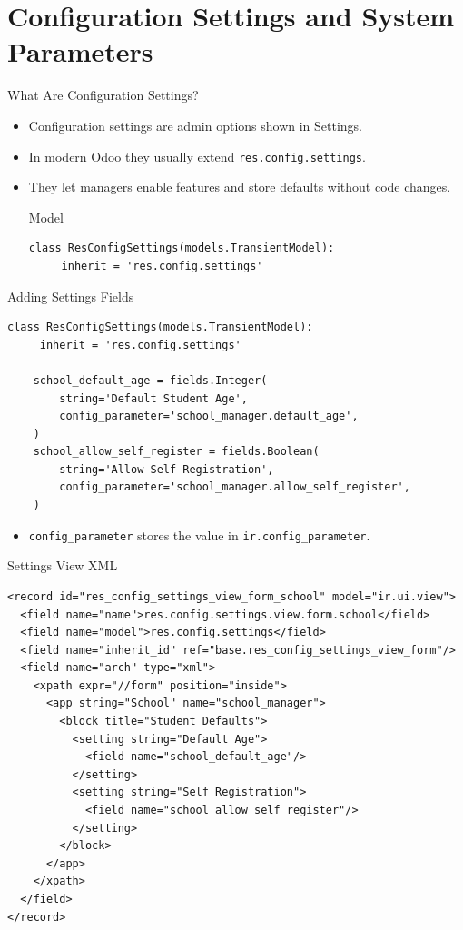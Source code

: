 \section{Configuration Settings and System Parameters}

\begin{frame}[fragile]{What Are Configuration Settings?}
	\begin{itemize}
		\item Configuration settings are admin options shown in Settings.
		\item In modern Odoo they usually extend \texttt{res.config.settings}.
		\item They let managers enable features and store defaults without code changes.
\begin{block}{Model}
\begin{lstlisting}
class ResConfigSettings(models.TransientModel):
	_inherit = 'res.config.settings'
\end{lstlisting}
\end{block}
	\end{itemize}
\end{frame}

\begin{frame}[fragile]{Adding Settings Fields}
\begin{lstlisting}
class ResConfigSettings(models.TransientModel):
	_inherit = 'res.config.settings'

	school_default_age = fields.Integer(
		string='Default Student Age',
		config_parameter='school_manager.default_age',
	)
	school_allow_self_register = fields.Boolean(
		string='Allow Self Registration',
		config_parameter='school_manager.allow_self_register',
	)
\end{lstlisting}
	\begin{itemize}
		\item \texttt{config\_parameter} stores the value in \texttt{ir.config\_parameter}.
	\end{itemize}
\end{frame}

\begin{frame}[fragile]{Settings View XML}
\begin{lstlisting}[style=xml]
<record id="res_config_settings_view_form_school" model="ir.ui.view">
  <field name="name">res.config.settings.view.form.school</field>
  <field name="model">res.config.settings</field>
  <field name="inherit_id" ref="base.res_config_settings_view_form"/>
  <field name="arch" type="xml">
	<xpath expr="//form" position="inside">
	  <app string="School" name="school_manager">
		<block title="Student Defaults">
		  <setting string="Default Age">
			<field name="school_default_age"/>
		  </setting>
		  <setting string="Self Registration">
			<field name="school_allow_self_register"/>
		  </setting>
		</block>
	  </app>
	</xpath>
  </field>
</record>
\end{lstlisting}
\end{frame}

